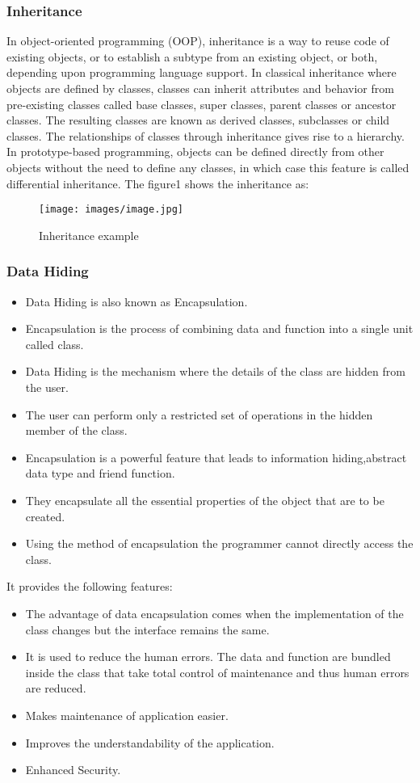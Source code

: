 	\subsubsection{Inheritance}
	In object-oriented programming (OOP), inheritance is a way to reuse code of existing objects, or to establish a subtype from an existing object, or both, depending upon programming language support. In classical inheritance where objects are defined by classes, classes can inherit attributes and behavior from pre-existing classes called base classes, super classes, parent classes or ancestor classes. The resulting classes are known as derived classes, subclasses or child classes. The relationships of classes through inheritance gives rise to a hierarchy. In prototype-based programming, objects can be defined directly from other objects without the need to define any classes, in which case this feature is called differential inheritance. The figure1 shows the inheritance as:
	\begin{figure}[h]
	\centering
	\texttt{[image: images/image.jpg]}
	\caption{Inheritance example}
	\end{figure}
	
	\subsubsection{Data Hiding}
	\begin{itemize}
	\item Data Hiding is also known as Encapsulation.
	\item Encapsulation is the process of combining data and function into a single unit called class.
	\item Data Hiding is the mechanism where the details of the class are hidden from the user.
	\item The user can perform only a restricted set of operations in the hidden member of the class.
	\item Encapsulation is a powerful feature that leads to information hiding,abstract data type and friend function.
	\item They encapsulate all the essential properties of the object that are to be created.
	\item Using the method of encapsulation the programmer cannot directly access the class.
	\end{itemize}
	It provides the following features:
	\begin{itemize}
	\item The advantage of data encapsulation comes when the implementation of the class changes but the interface remains the same.
	\item It is used to reduce the human errors. The data and function are bundled inside the class that take total control of maintenance 			and thus human errors are reduced. 
	\item Makes maintenance of application easier. 
	\item Improves the understandability of the application. 
	\item Enhanced Security.
	\end{itemize}

